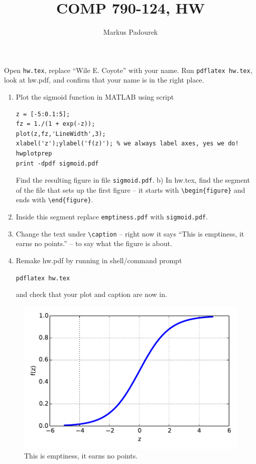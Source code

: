 \documentclass{article}
\begin{document}
\author{Markus Padourek}
\title{COMP  790-124, HW\theHW}
\maketitle



\newproblem{0.01pt} Open \texttt{hw\theHW.tex}, replace ``Wile E. Coyote'' with your name. Run
\texttt{pdflatex hw\theHW.tex}, look at hw\theHW.pdf, and confirm that your name is in the right place.


\newproblem{1pt}
\begin{enumerate}
\item Plot the sigmoid function in MATLAB using script
\begin{verbatim}
z = [-5:0.1:5];
fz = 1./(1 + exp(-z));
plot(z,fz,'LineWidth',3);
xlabel('z');ylabel('f(z)'); % we always label axes, yes we do!
hwplotprep
print -dpdf sigmoid.pdf
\end{verbatim}
Find the resulting figure in file {\tt sigmoid.pdf}.
b) In hw\theHW.tex, find the segment of the file that sets up the first figure -- it starts with {\tt \textbackslash begin\{figure\}} and ends with  {\tt \textbackslash end\{figure\}}.
\item Inside this segment  replace {\tt emptiness.pdf} with {\tt sigmoid.pdf}.
\item Change the text under {\tt \textbackslash caption} -- right now it says ``This is emptiness, it earns no points.'' -- to say what the figure is about.
\item Remake hw\theHW.pdf by running in shell/command prompt

     \texttt{pdflatex hw\theHW.tex}

and check that your plot and caption are now in.
\end{enumerate}


\begin{figure}[H]
\begin{center}
\includegraphics[scale=0.5]{sigmoid.pdf}
\caption{This is emptiness, it earns no points.}
\end{center}
\end{figure}
\end{document}
